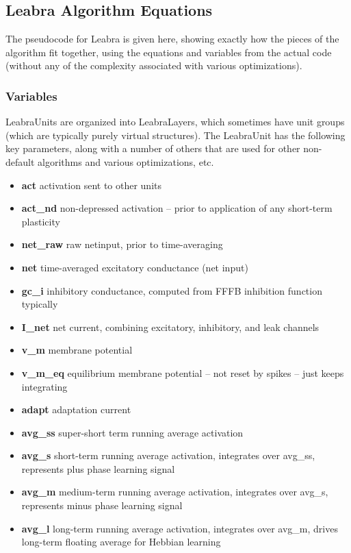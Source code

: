 
\subsection{Leabra Algorithm Equations}

The pseudocode for Leabra is given here, showing exactly how the pieces of the algorithm fit together, using the equations and variables from the actual code (without any of the complexity associated with various optimizations).

\subsubsection{Variables}

LeabraUnits are organized into LeabraLayers, which sometimes have unit groups (which are typically purely virtual structures).  The LeabraUnit has the following key parameters, along with a number of others that are used for other non-default algorithms and various optimizations, etc.
\begin{itemize}
\item {\bf act} activation sent to other units
\item {\bf act\_nd} non-depressed activation -- prior to application of any short-term plasticity
\item {\bf net\_raw} raw netinput, prior to time-averaging
\item {\bf net} time-averaged excitatory conductance (net input)
\item {\bf gc\_i} inhibitory conductance, computed from FFFB inhibition function typically
\item {\bf I\_net} net current, combining excitatory, inhibitory, and leak channels
\item {\bf v\_m} membrane potential
\item {\bf v\_m\_eq} equilibrium membrane potential -- not reset by spikes -- just keeps integrating
\item {\bf adapt} adaptation current
\item {\bf avg\_ss} super-short term running average activation
\item {\bf avg\_s} short-term running average activation, integrates over avg\_ss, represents plus phase learning signal
\item {\bf avg\_m} medium-term running average activation, integrates over avg\_s, represents minus phase learning signal
\item {\bf avg\_l} long-term running average activation, integrates over avg\_m, drives long-term floating average for Hebbian learning
\end{itemize}

